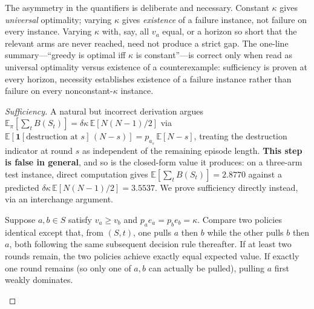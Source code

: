 The asymmetry in the quantifiers is deliberate and necessary. Constant $\kappa$
gives \emph{universal} optimality; varying $\kappa$ gives \emph{existence} of a
failure instance, not failure on every instance. Varying $\kappa$ with, say, all
$v_a$ equal, or a horizon so short that the relevant arms are never reached, need
not produce a strict gap. The one-line summary---``greedy is optimal iff $\kappa$
is constant''---is correct only when read as universal optimality versus existence
of a counterexample: sufficiency is proven at every horizon, necessity establishes
existence of a failure instance rather than failure on every nonconstant-$\kappa$
instance.

\begin{proof}[Sufficiency]
\label{proof:char}
A natural but incorrect derivation argues
$\mathbb{E}_\pi[\sum_t B(S_t)] = \delta\kappa\,\mathbb{E}[N(N-1)/2]$ via
$\mathbb{E}[\mathbf{1}[\text{destruction at }s]\,(N-s)] = p_{a_s}\,\mathbb{E}[N-s]$,
treating the destruction indicator at round $s$ as independent of the
remaining episode length. \textbf{This step is false in general}, and so is the
closed-form value it produces: on a three-arm test instance, direct computation
gives $\mathbb{E}[\sum_t B(S_t)] = 2.8770$ against a predicted
$\delta\kappa\,\mathbb{E}[N(N{-}1)/2] = 3.5537$. We prove
sufficiency directly instead, via an interchange argument.

\begin{lemma}
\label{lem:interchange}
Suppose $a,b\in S$ satisfy $v_a \ge v_b$ and $p_a e_a = p_b e_b = \kappa$.
Compare two policies identical except that, from $(S,t)$, one pulls $a$ then
$b$ while the other pulls $b$ then $a$, both following the same subsequent
decision rule thereafter. If at least two rounds remain, the two policies
achieve exactly equal expected value. If exactly one round remains (so only
one of $a,b$ can actually be pulled), pulling $a$ first weakly dominates.
\end{lemma}


\end{proof}
